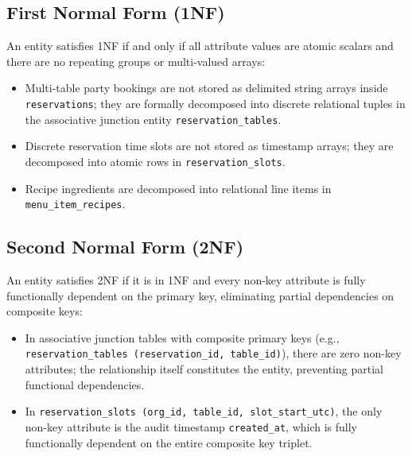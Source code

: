 \subsection{First Normal Form (1NF)}
An entity satisfies 1NF if and only if all attribute values are atomic scalars and there are no repeating groups or multi-valued arrays:
\begin{itemize}
    \item Multi-table party bookings are not stored as delimited string arrays inside \texttt{reservations}; they are formally decomposed into discrete relational tuples in the associative junction entity \texttt{reservation\_tables}.
    \item Discrete reservation time slots are not stored as timestamp arrays; they are decomposed into atomic rows in \texttt{reservation\_slots}.
    \item Recipe ingredients are decomposed into relational line items in \texttt{menu\_item\_recipes}.
\end{itemize}

\subsection{Second Normal Form (2NF)}
An entity satisfies 2NF if it is in 1NF and every non-key attribute is fully functionally dependent on the primary key, eliminating partial dependencies on composite keys:
\begin{itemize}
    \item In associative junction tables with composite primary keys (e.g., \texttt{reservation\_tables (reservation\_id, table\_id)}), there are zero non-key attributes; the relationship itself constitutes the entity, preventing partial functional dependencies.
    \item In \texttt{reservation\_slots (org\_id, table\_id, slot\_start\_utc)}, the only non-key attribute is the audit timestamp \texttt{created\_at}, which is fully functionally dependent on the entire composite key triplet.
\end{itemize}

